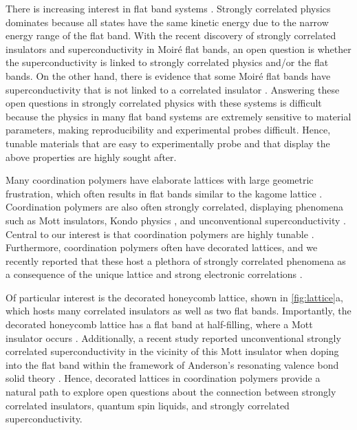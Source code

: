 \documentclass[reprint,aps,prb,amsmath,amssymb]{revtex4-2}
\begin{document}
There is increasing interest in flat band systems \cite{Balents2020}. Strongly correlated physics dominates because all states have the same kinetic energy due to the narrow energy range of the flat band. With the recent discovery of strongly correlated insulators \cite{Kim2017,Cao2018,Chen2019,Choi2019,Tang2020,Balents2020} and superconductivity \cite{Cao2018b,Yankowitz2019,Lu2019,Chen2019b,Stepanov2020,Emilio2022,Arora2020,Stepanov2020,Balents2020} in Moir\'e flat bands, an open question is whether the superconductivity is linked to strongly correlated physics and/or the flat bands. On the other hand, there is evidence that some Moir\'e flat bands have superconductivity that is not linked to a correlated insulator \cite{Arora2020,Stepanov2020,Balents2020}. Answering these open questions in strongly correlated physics \cite{Dagotto1994,Imada1998,Orenstein2000,Lee2006,Scalapino2012,Fradkin2015,Keimer2015} with these systems is difficult because the physics in many flat band systems are extremely sensitive to material parameters, making reproducibility and experimental probes difficult. 
%
%
Hence, tunable materials that are easy to experimentally probe and that display the above properties are highly sought after.

Many coordination polymers \cite{Batten2013} have elaborate lattices with large geometric frustration, which often results in flat bands similar to the kagome lattice \cite{Murase2017,Murase2017b,Kingsbury2017,Jeon2015,Darago2015,DeGayner2017,Henling2014,Henline2014,Polunin2015,Kalmutzki2018,Jiang2019,Kumar2021}. Coordination polymers are also often strongly correlated, displaying phenomena such as Mott insulators, Kondo physics \cite{Jiang2019,Kumar2021}, and unconventional superconductivity \cite{Zhang2017,Huang2018,Takenaka2021}. Central to our interest is that coordination polymers are highly tunable \cite{Yaghi2016}. Furthermore, coordination polymers often have decorated lattices, and we recently reported that these host a plethora of strongly correlated phenomena as a consequence of the unique lattice and strong electronic correlations \cite{Nourse2021a,Nourse2021b}. 

Of particular interest is the decorated honeycomb lattice, shown in \cref{fig:lattice}a, which hosts many correlated insulators as well as two flat bands. Importantly, the decorated honeycomb lattice has a flat band at half-filling, where a Mott insulator occurs \cite{Nourse2021a}. Additionally, a recent study \cite{Merino2021} reported unconventional strongly correlated superconductivity in the vicinity of this Mott insulator when doping into the flat band within the framework of Anderson's resonating valence bond solid theory \cite{Merino2021}. Hence, decorated lattices in coordination polymers provide a natural path to explore open questions about the connection between strongly correlated insulators, quantum spin liquids, and strongly correlated superconductivity. 
\end{document}
